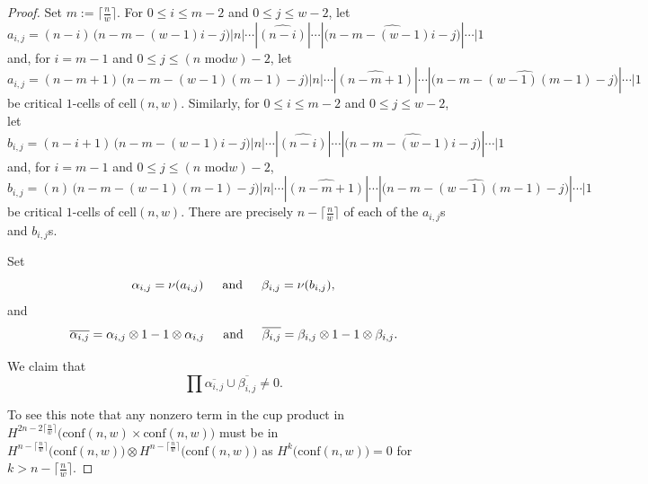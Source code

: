 \documentclass[pagebackref,colorlinks,citecolor=blue,linkcolor=blue,urlcolor=blue,filecolor=blue]{article}
\theoremstyle{definition}\newtheorem{definition}[thm]{Definition}
\theoremstyle{definition}
\begin{document}
\begin{proof}
Set $m:=\big\lceil\frac{n}{w}\big\rceil$.
For $0\le i\le m-2$ and $0\le j\le w-2$, let
\[
a_{i, j}=(n-i)\, \big(n-m-(w-1)i-j\big)|n|\cdots|\widehat{(n-i)}|\cdots|\widehat{\big(n-m-(w-1)i-j\big)}|\cdots|1
\]
and, for $i=m-1$ and $0\le j\le (n\text{ mod}w)-2$, let
\[
a_{i,j}=(n-m+1)\, \big(n-m-(w-1)(m-1)-j\big)|n|\cdots|\widehat{(n-m+1)}|\cdots|\widehat{\big(n-m-(w-1)(m-1)-j\big)}|\cdots|1
\]
be critical $1$-cells of $\text{cell}(n,w)$.
Similarly, for $0\le i\le m-2$ and $0\le j\le w-2$, let
\[
b_{i, j}=(n-i+1)\, \big(n-m-(w-1)i-j\big)|n|\cdots|\widehat{(n-i)}|\cdots|\widehat{\big(n-m-(w-1)i-j\big)}|\cdots|1
\]
and, for $i=m-1$ and $0\le j\le (n\text{ mod}w)-2$,
\[
b_{i,j}=(n)\, \big(n-m-(w-1)(m-1)-j\big)|n|\cdots|\widehat{(n-m+1)}|\cdots|\widehat{\big(n-m-(w-1)(m-1)-j\big)}|\cdots|1
\]
be critical $1$-cells of $\text{cell}(n,w)$.
There are precisely $n-\big\lceil\frac{n}{w}\big\rceil$ of each of the $a_{i, j}$s and $b_{i,j}$s.

Set
\[
\alpha_{i,j}=\nu(a_{i,j})\indent\text{and}\indent\beta_{i,j}=\nu(b_{i,j}),
\]
and
\[
\overline{\alpha_{i,j}}=\alpha_{i,j}\otimes 1-1\otimes \alpha_{i,j}\indent\text{and}\indent
\overline{\beta_{i,j}}=\beta_{i,j}\otimes 1-1\otimes \beta_{i,j}.
\]

We claim that 
\[
\prod\overline{\alpha_{i,j}}\cup\overline{\beta_{i,j}}\neq0.
\]

To see this note that any nonzero term in the cup product in $H^{2n-2\big\lceil\frac{n}{w}\big\rceil}\big(\text{conf}(n,w)\times \text{conf}(n,w)\big)$ must be in $H^{n-\lceil\frac{n}{w}\rceil}\big(\text{conf}(n,w)\big)\otimes H^{n-\lceil\frac{n}{w}\rceil}\big(\text{conf}(n,w)\big)$ as $H^{k}\big(\text{conf}(n,w)\big)=0$ for $k>n-\big\lceil\frac{n}{w}\big\rceil$.


\end{proof}
\end{document}
